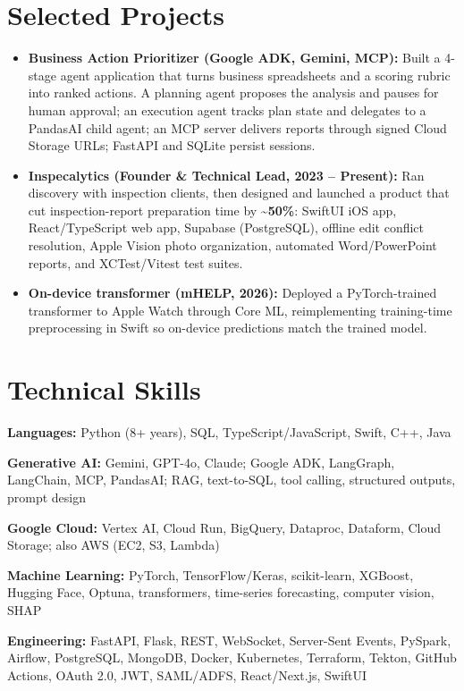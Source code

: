 \documentclass[letterpaper,10pt]{article}
\begin{document}
\section{Selected Projects}
\begin{itemize}
\item \textbf{Business Action Prioritizer (Google ADK, Gemini, MCP):} Built a 4-stage agent application that turns business spreadsheets and a scoring rubric into ranked actions. A planning agent proposes the analysis and pauses for human approval; an execution agent tracks plan state and delegates to a PandasAI child agent; an MCP server delivers reports through signed Cloud Storage URLs; FastAPI and SQLite persist sessions.
\item \textbf{Inspecalytics (Founder \& Technical Lead, 2023 -- Present):} Ran discovery with inspection clients, then designed and launched a product that cut inspection-report preparation time by \textbf{\textasciitilde 50\%}: SwiftUI iOS app, React/TypeScript web app, Supabase (PostgreSQL), offline edit conflict resolution, Apple Vision photo organization, automated Word/PowerPoint reports, and XCTest/Vitest test suites.
\item \textbf{On-device transformer (mHELP, 2026):} Deployed a PyTorch-trained transformer to Apple Watch through Core ML, reimplementing training-time preprocessing in Swift so on-device predictions match the trained model.
\end{itemize}

\section{Technical Skills}
\textbf{Languages:} Python (8+ years), SQL, TypeScript/JavaScript, Swift, C++, Java\par
\textbf{Generative AI:} Gemini, GPT-4o, Claude; Google ADK, LangGraph, LangChain, MCP, PandasAI; RAG, text-to-SQL, tool calling, structured outputs, prompt design\par
\textbf{Google Cloud:} Vertex AI, Cloud Run, BigQuery, Dataproc, Dataform, Cloud Storage; also AWS (EC2, S3, Lambda)\par
\textbf{Machine Learning:} PyTorch, TensorFlow/Keras, scikit-learn, XGBoost, Hugging Face, Optuna, transformers, time-series forecasting, computer vision, SHAP\par
\textbf{Engineering:} FastAPI, Flask, REST, WebSocket, Server-Sent Events, PySpark, Airflow, PostgreSQL, MongoDB, Docker, Kubernetes, Terraform, Tekton, GitHub Actions, OAuth 2.0, JWT, SAML/ADFS, React/Next.js, SwiftUI\par
\end{document}
